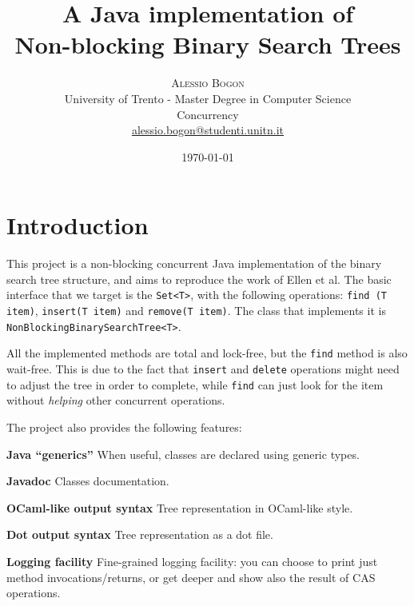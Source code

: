 \documentclass[a4paper,draft,12pt]{article}
\title{\textbf{A Java implementation of \\Non-blocking Binary Search Trees}} %
\author{
    \textsc{Alessio Bogon}\\[2mm] %
    \normalsize University of Trento - Master Degree in Computer Science\\ %
    \normalsize Concurrency\\
    \href{mailto:alessio.bogon@studenti.unitn.it}{alessio.bogon@studenti.unitn.it} %
}
\date{\today}
\begin{document}
\maketitle


\section{Introduction} %
\label{sec:introduction}
This project is a non-blocking concurrent Java implementation of the binary search tree structure, and aims to reproduce the work of Ellen et al\cite{ellen10}.
The basic interface that we target is the \texttt{Set<T>}, with the following operations: \texttt{find (T item)}, \texttt{insert(T item)} and \texttt{remove(T item)}.
The class that implements it is \texttt{Non\-Blocking\-Binary\-Search\-Tree\-<T>}.

All the implemented methods are total and lock-free, but the \texttt{find} method is also wait-free.
This is due to the fact that \texttt{insert} and \texttt{delete} operations might need to adjust the tree in order to complete, while \texttt{find} can just look for the item without \emph{helping} other concurrent operations.

The project also provides the following features:
\begin{itemize*}
    \item \textbf{Java ``generics''} When useful, classes are declared using generic types.
    \item \textbf{Javadoc} Classes documentation.
    \item \textbf{OCaml-like output syntax} Tree representation in OCaml-like style.
    \item \textbf{Dot output syntax} Tree representation as a dot file.
    \item \textbf{Logging facility} Fine-grained logging facility: you can choose to print just method invocations/\-returns, or get deeper and show also the result of CAS operations.
\end{itemize*}



\end{document}
